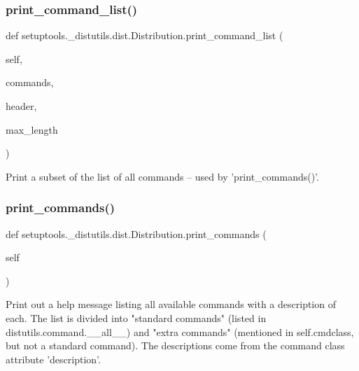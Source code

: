 \subsubsection{\texorpdfstring{print\+\_\+command\+\_\+list()}{print\_command\_list()}}
{\footnotesize\ttfamily def setuptools.\+\_\+distutils.\+dist.\+Distribution.\+print\+\_\+command\+\_\+list (\begin{DoxyParamCaption}\item[{}]{self,  }\item[{}]{commands,  }\item[{}]{header,  }\item[{}]{max\+\_\+length }\end{DoxyParamCaption})}

\begin{DoxyVerb}Print a subset of the list of all commands -- used by
'print_commands()'.
\end{DoxyVerb}
 \mbox{\label{classsetuptools_1_1__distutils_1_1dist_1_1Distribution_aa79c673a64b82f2eb74e97c81b9962ac}} 
\subsubsection{\texorpdfstring{print\+\_\+commands()}{print\_commands()}}
{\footnotesize\ttfamily def setuptools.\+\_\+distutils.\+dist.\+Distribution.\+print\+\_\+commands (\begin{DoxyParamCaption}\item[{}]{self }\end{DoxyParamCaption})}

\begin{DoxyVerb}Print out a help message listing all available commands with a
description of each.  The list is divided into "standard commands"
(listed in distutils.command.__all__) and "extra commands"
(mentioned in self.cmdclass, but not a standard command).  The
descriptions come from the command class attribute
'description'.
\end{DoxyVerb}
 \mbox{\label{classsetuptools_1_1__distutils_1_1dist_1_1Distribution_a24f133bafe53add90f14ff703f89b0eb}} 
